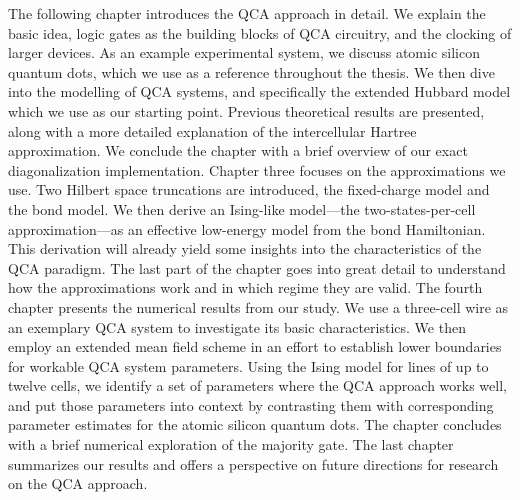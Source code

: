 The following chapter introduces the QCA approach in detail. We explain the
basic idea, logic gates as the building blocks of QCA circuitry, and the
clocking of larger devices. As an example experimental system, we discuss atomic
silicon quantum dots, which we use as a reference throughout the thesis. We then
dive into the modelling of QCA systems, and specifically the extended Hubbard
model which we use as our starting point. Previous theoretical results are
presented, along with a more detailed explanation of the intercellular Hartree
approximation. We conclude the chapter with a brief overview of our exact
diagonalization implementation. Chapter three focuses on the approximations we
use. Two Hilbert space truncations are introduced, the fixed-charge model and
the bond model. We then derive an Ising-like model---the two-states-per-cell
approximation---as an effective low-energy model from the bond Hamiltonian. This
derivation will already yield some insights into the characteristics of the QCA
paradigm. The last part of the chapter goes into great detail to understand how
the approximations work and in which regime they are valid. The fourth chapter
presents the numerical results from our study. We use a three-cell wire as an
exemplary QCA system to investigate its basic characteristics. We then employ an
extended mean field scheme in an effort to establish lower boundaries for
workable QCA system parameters. Using the Ising model for lines of up to twelve
cells, we identify a set of parameters where the QCA approach works well, and
put those parameters into context by contrasting them with corresponding
parameter estimates for the atomic silicon quantum dots. The chapter concludes
with a brief numerical exploration of the majority gate. The last chapter
summarizes our results and offers a perspective on future directions for
research on the QCA approach.
